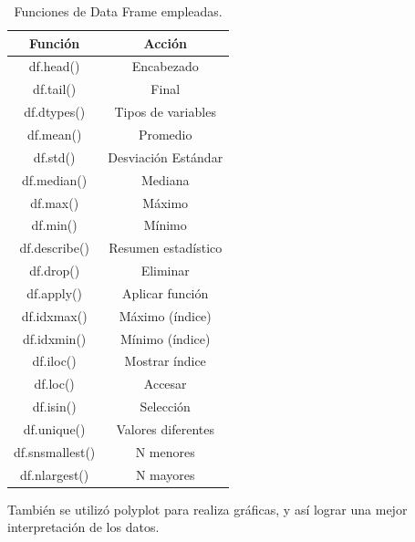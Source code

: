 \documentclass[12pt]{article}
\begin{document}
\begin{table}[]
\centering
\caption{Funciones de Data Frame empleadas.}
\begin{tabular}{|c|c|}
\hline
Función         & Acción              \\ \hline
df.head()       & Encabezado          \\ \hline
df.tail()       & Final               \\ \hline
df.dtypes()     & Tipos de variables  \\ \hline
df.mean()       & Promedio            \\ \hline
df.std()        & Desviación Estándar \\ \hline
df.median()     & Mediana             \\ \hline
df.max()        & Máximo              \\ \hline
df.min()        & Mínimo              \\ \hline
df.describe()   & Resumen estadístico \\ \hline
df.drop()       & Eliminar            \\ \hline
df.apply()      & Aplicar función     \\ \hline
df.idxmax()     & Máximo (índice)     \\ \hline
df.idxmin()     & Mínimo (índice)     \\ \hline
df.iloc()       & Mostrar índice      \\ \hline
df.loc()        & Accesar             \\ \hline
df.isin()       & Selección           \\ \hline
df.unique()     & Valores diferentes  \\ \hline
df.snsmallest() & N menores           \\ \hline
df.nlargest()   & N mayores           \\ \hline
\end{tabular}
\end{table}
También se utilizó polyplot para realiza gráficas, y así lograr una mejor interpretación de los datos.


\newpage
\end{document}
